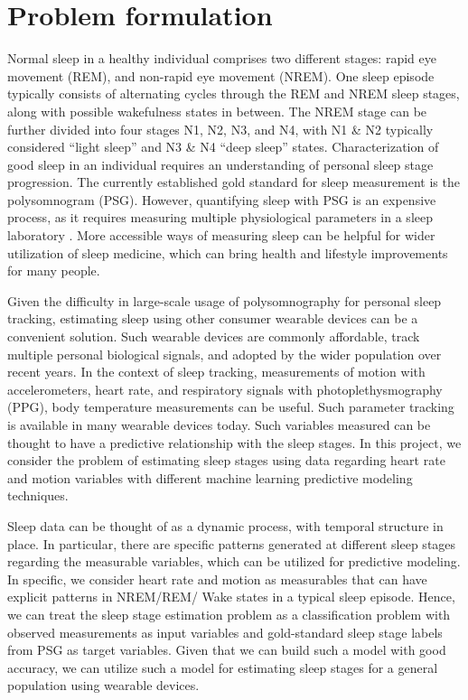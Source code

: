 \documentclass[12pt]{article}
\begin{document}
\section{Problem formulation}
Normal sleep in a healthy individual comprises two different stages: rapid eye movement (REM), and non-rapid eye movement (NREM). One sleep episode typically consists of alternating cycles through the REM and NREM sleep stages, along with possible wakefulness states in between. The NREM stage can be further divided into four stages N1, N2, N3, and N4, with N1 \& N2 typically considered ``light sleep''  and N3 \& N4 ``deep sleep'' states. Characterization of good sleep in an individual requires an understanding of personal sleep stage progression.  The currently established gold standard for sleep measurement is the polysomnogram (PSG). However, quantifying sleep with PSG is an expensive process, as it requires measuring multiple physiological parameters in a sleep laboratory \citep{berry2015aasm}. More accessible ways of measuring sleep can be helpful for wider utilization of sleep medicine, which can bring health and lifestyle improvements for many people.



Given the difficulty in large-scale usage of polysomnography for personal sleep tracking, estimating sleep using other consumer wearable devices can be a convenient solution. Such wearable devices are commonly affordable, track multiple personal biological signals, and adopted by the wider population over recent years. In the context of sleep tracking, measurements of motion with accelerometers, heart rate, and respiratory signals with photoplethysmography (PPG), body temperature measurements can be useful. Such parameter tracking is available in many wearable devices today. Such variables measured can be thought to have a predictive relationship with the sleep stages. In this project, we consider the problem of estimating sleep stages using data regarding heart rate and motion variables with different machine learning predictive modeling techniques. 



Sleep data can be thought of as a dynamic process, with temporal structure in place. In particular, there are specific patterns generated at different sleep stages regarding the measurable variables, which can be utilized for predictive modeling. In specific, we consider heart rate and motion as measurables that can have explicit patterns in NREM/REM/ Wake states in a typical sleep episode. Hence, we can treat the sleep stage estimation problem as a classification problem with observed measurements as input variables and gold-standard sleep stage labels from PSG as target variables. Given that we can build such a model with good accuracy, we can utilize such a model for estimating sleep stages for a general population using wearable devices.  
\end{document}
